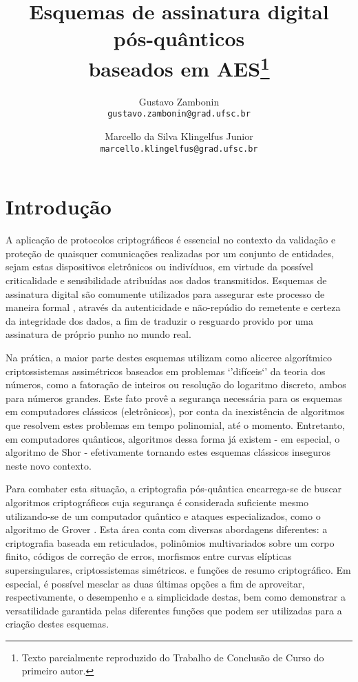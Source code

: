 \documentclass{article}
\title{Esquemas de assinatura digital pós-quânticos \\ baseados em AES\footnote{Texto parcialmente reproduzido do Trabalho de Conclusão de Curso do primeiro autor.}}
\author{Gustavo Zambonin \\ \texttt{gustavo.zambonin@grad.ufsc.br} \and Marcello da Silva Klingelfus Junior \\ \texttt{marcello.klingelfus@grad.ufsc.br}}
\date{}
\begin{document}
\maketitle

\section{Introdução}

A aplicação de protocolos criptográficos é essencial no contexto da validação e
proteção de quaisquer comunicações realizadas por um conjunto de entidades,
sejam estas dispositivos eletrônicos ou indivíduos, em virtude da possível
criticalidade e sensibilidade atribuídas aos dados transmitidos. Esquemas de
assinatura digital são comumente utilizados para assegurar este processo de
maneira formal \cite{Goldreich:2004:FCV:975541}, através da autenticidade e
não-repúdio do remetente e certeza da integridade dos dados, a fim de
traduzir o resguardo provido por uma assinatura de próprio punho no mundo real.

Na prática, a maior parte destes esquemas utilizam como alicerce algorítmico
criptossistemas assimétricos baseados em problemas `'difíceis`' da teoria
dos números, como a fatoração de inteiros ou resolução do logaritmo discreto,
ambos para números grandes. Este fato provê a segurança necessária para os
esquemas em computadores clássicos (eletrônicos), por conta da inexistência de
algoritmos que resolvem estes problemas em tempo polinomial, até o momento.
Entretanto, em computadores quânticos, algoritmos dessa forma já existem - em
especial, o algoritmo de Shor \cite{Shor:1997:PAP:264393.264406} - efetivamente
tornando estes esquemas clássicos inseguros neste novo contexto.

Para combater esta situação, a criptografia pós-quântica encarrega-se de buscar
algoritmos criptográficos cuja segurança é considerada suficiente mesmo
utilizando-se de um computador quântico e ataques especializados, como o
algoritmo de Grover \cite{Grover:1996:FQM:237814.237866}. Esta área conta com
diversas abordagens diferentes: a criptografia baseada em reticulados,
polinômios multivariados sobre um corpo finito, códigos de correção de erros,
morfismos entre curvas elípticas supersingulares, criptossistemas simétricos.
e funções de resumo criptográfico. Em especial, é possível mesclar as duas
últimas opções a fim de aproveitar, respectivamente, o desempenho e a
simplicidade destas, bem como demonstrar a versatilidade garantida pelas
diferentes funções que podem ser utilizadas para a criação destes esquemas.
\end{document}
